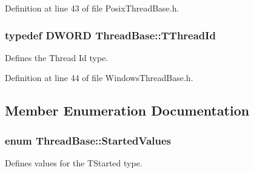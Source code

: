 Definition at line 43 of file Posix\-Thread\-Base.\-h.

\hypertarget{class_thread_base_a76da3758dcb9858188c493eb9b811f3d}{
\subsubsection[{T\-Thread\-Id}]{\setlength{\rightskip}{0pt plus 5cm}typedef D\-W\-O\-R\-D {\bf Thread\-Base\-::\-T\-Thread\-Id}\hspace{0.3cm}{\ttfamily [private]}}}\label{class_thread_base_a76da3758dcb9858188c493eb9b811f3d}


Defines the Thread Id type. 



Definition at line 44 of file Windows\-Thread\-Base.\-h.



\subsection{Member Enumeration Documentation}
\hypertarget{class_thread_base_a6676ad16581b715cf6d59180fd990cf1}{
\subsubsection[{Started\-Values}]{\setlength{\rightskip}{0pt plus 5cm}enum {\bf Thread\-Base\-::\-Started\-Values}}}\label{class_thread_base_a6676ad16581b715cf6d59180fd990cf1}


Defines values for the T\-Started type. 

